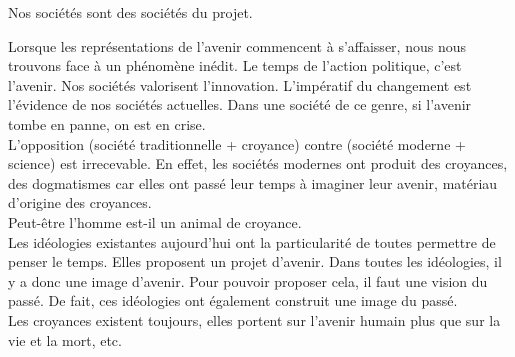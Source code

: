 \documentclass[a4paper,11pt]{article}
\begin{document}
	Nos sociétés sont des sociétés du projet.	
	
	Lorsque les représentations de l’avenir commencent à s’affaisser, nous nous trouvons face à un phénomène inédit.
	Le temps de l’action politique, c’est l’avenir.
	Nos sociétés valorisent l’innovation.
	L’impératif du changement est l’évidence de nos sociétés actuelles.
	Dans une société de ce genre, si l’avenir tombe en panne, on est en crise.\\
	
	
	L’opposition (société traditionnelle + croyance) contre (société moderne + science) est irrecevable.
	En effet, les sociétés modernes ont produit des croyances, des dogmatismes car elles ont passé leur temps à imaginer leur avenir, matériau d’origine des croyances.\\
	
	
	Peut-être l’homme est-il un animal de croyance.\\
	
	
	Les idéologies existantes aujourd’hui ont la particularité de toutes permettre de penser le temps. Elles proposent un projet d’avenir. Dans toutes les idéologies, il y a donc une image d’avenir. Pour pouvoir proposer cela, il faut une vision du passé. De fait, ces idéologies ont également construit une image du passé.\\

	
	Les croyances existent toujours, elles portent sur l’avenir humain plus que sur la vie et la mort, etc.
\end{document}
